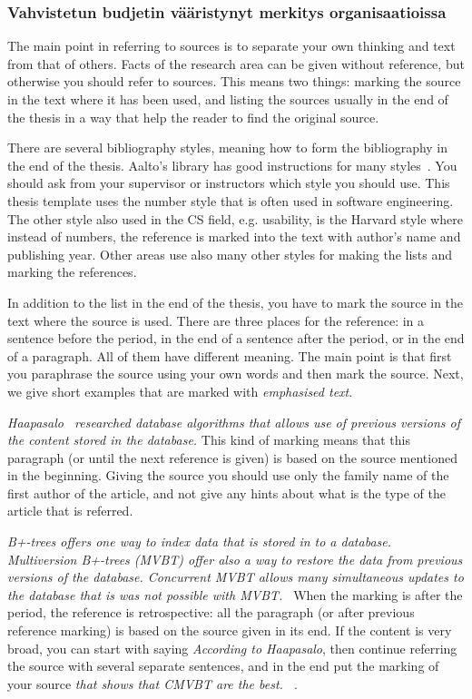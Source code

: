 \documentclass[12pt,a4paper,oneside,pdftex]{report}
\begin{document}
\subsubsection{Vahvistetun budjetin vääristynyt merkitys organisaatioissa}

The main point in referring to sources is to separate your own
thinking and text from that of others. Facts of the research area can
be given without reference, but otherwise you should refer to
sources. This means two things: marking the source in the text where
it has been used, and listing the sources usually in the end of the
thesis in a way that help the reader to find the original source.

There are several bibliography styles, meaning how to form the
bibliography in the end of the thesis. Aalto's library has good
instructions for many styles~\cite{bibinstructions}. You should ask
from your supervisor or instructors which style you should use. This
thesis template uses the number style that is often used in software
engineering. The other style also used in the CS field,
e.g. usability, is the Harvard style where instead of numbers, the
reference is marked into the text with author's name and publishing
year. Other areas use also many other styles for making the lists and
marking the references.

In addition to the list in the end of the thesis, you have to mark the
source in the text where the source is used. There are three places
for the reference: in a sentence before the period, in the end of a
sentence after the period, or in the end of a paragraph. All of them
have different meaning. The main point is that first you paraphrase
the source using your own words and then mark the source. Next, we
give short examples that are marked with \emph{emphasised text}.

\emph{Haapasalo~\cite{HaapasaloThesis} researched database algorithms
  that allows use of previous versions of the content stored in the
  database.} This kind of marking means that this paragraph (or until
the next reference is given) is based on the source mentioned in the
beginning.  Giving the source you should use only the family name of
the first author of the article, and not give any hints about what is
the type of the article that is referred.

\emph{B+-trees offers one way to index data that is stored in to a
  database. Multiversion B+-trees (MVBT) offer also a way to restore
  the data from previous versions of the database. Concurrent MVBT
  allows many simultaneous updates to the database that is was not
  possible with MVBT.~\cite{HaapasaloThesis}} When the marking is
after the period, the reference is retrospective: all the paragraph
(or after previous reference marking) is based on the source given in
its end. If the content is very broad, you can start with saying
\emph{According to Haapasalo}, then continue referring the source with
several separate sentences, and in the end put the marking of your
source \emph{ that shows that CMVBT are the
  best. ~\cite{HaapasaloThesis}}.
\end{document}
